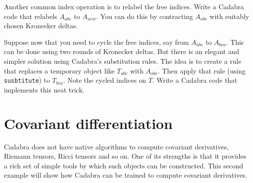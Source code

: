 \documentclass[a4paper,12pt]{article}
\numberwithin{equation}{section}%
\begin{document}
\begin{Exercises}
   \begin{Exercise}
      Another common index operation is to relabel the free indices. Write a Cadabra code
      that relabels $A_{a b c}$ to $A_{u v w}$. You can do this by contracting
      $A_{a b c}$ with suitably chosen Kronecker deltas.
   \end{Exercise}

   \begin{Exercise}
      Suppose now that you need to cycle the free indices, say from $A_{a b c}$ to
      $A_{b c a}$. This can be done using two rounds of Kronecker deltas. But there is an
      elegant and simpler solution using Cadabra's substitution rules. The idea is to
      create a rule that replaces a temporary object like $T_{a b c}$ with $A_{a b c}$.
      Then apply that rule (using \verb|susbtitute|) to $T_{b c a}$. Note the cycled
      indices on $T$. Write a Cadabra code that implements this neat trick.
   \end{Exercise}

\end{Exercises}

\clearpage

\section{Covariant differentiation}%
\label{sec:ex-02}
\setcounter{ExerciseNum}{0}



Cadabra does not have native algorithms to compute covariant derivatives, Riemann
tensors, Ricci tensors and so on. One of its strengths is that it provides a rich set of
simple tools by which such objects can be constructed. This second example will show how
Cadabra can be trained to compute covariant derivatives.
\end{document}
